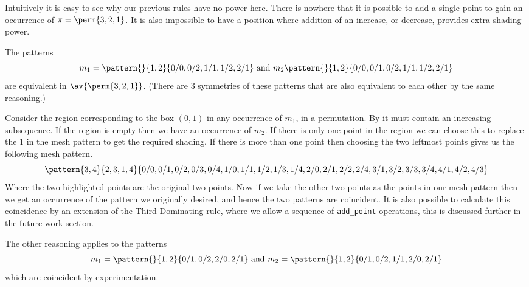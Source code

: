 Intuitively it is easy to see why our previous rules have no
power here. There is nowhere that it is possible to add a single point to
gain an occurrence of \(\pi = \perm{3,2,1}\). It is also impossible to have
a position where addition of an increase, or decrease, provides extra
shading power.

The patterns
\begin{equation*}
    m_1 = \pattern{}{1,2}{0/0, 0/2, 1/1, 1/2, 2/1} \text { and } m_2 \pattern{}{1,2}{0/0, 0/1, 0/2, 1/1, 1/2, 2/1}
\end{equation*}
are equivalent in \(\av{\perm{3,2,1}}\). (There are 3 symmetries of these
patterns that are also equivalent to each other by the same reasoning.)

Consider the region corresponding to the box \((0,1)\) in any occurrence of \(m_1\),
in a permutation. By  it must contain an increasing subsequence.
If the region is empty then we have an occurrence of \(m_2\).
If there is only one point in the region we can choose this to replace the \(1\) in
the mesh pattern to get the required shading. If there is more than one point then
choosing the two leftmost points gives us the following mesh pattern.
\begin{equation*}
    \pattern{3,4}{2,3,1,4}{0/0, 0/1, 0/2, 0/3, 0/4,
                            1/0, 1/1, 1/2, 1/3, 1/4,
                            2/0, 2/1,2/2, 2/4,
                            3/1, 3/2, 3/3, 3/4,
                            4/1, 4/2, 4/3}
\end{equation*}
Where the two highlighted points are the original two points.
Now if we take the other two points as the points in our
mesh pattern then we get an occurrence of the pattern
we originally desired, and hence the two patterns are coincident.
It is also possible to calculate this coincidence by an extension of the Third
Dominating rule, where we allow a sequence of \texttt{add\_point} operations, this
is discussed further in the future work section.

The other reasoning applies to the patterns
\begin{equation*}
    m_1 = \pattern{}{1,2}{0/1,0/2,2/0,2/1} \text{ and } m_2 = \pattern{}{1,2}{0/1,0/2,1/1,2/0,2/1}
\end{equation*}
which are coincident by experimentation.


